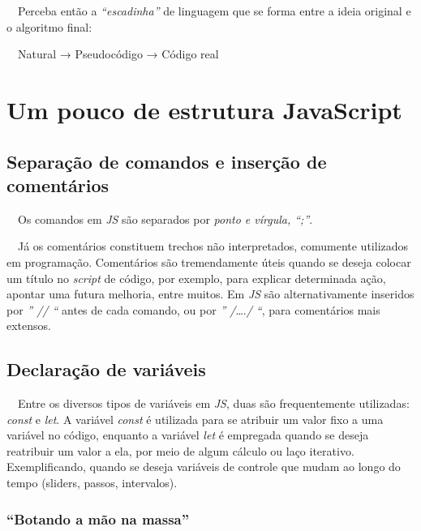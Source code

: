 \documentclass[
  portuguese,
  letterpaper,
  DIV=11,
  numbers=noendperiod]{scrreprt}
\begin{document}
\hfill\break

~~Perceba então a \emph{``escadinha''} de linguagem que se forma entre a
ideia original e o algoritmo final:

~~Natural → Pseudocódigo → Código real


\chapter{Um pouco de estrutura
JavaScript}\label{um-pouco-de-estrutura-javascript}

\section{Separação de comandos e inserção de
comentários}\label{separauxe7uxe3o-de-comandos-e-inseruxe7uxe3o-de-comentuxe1rios}

~~Os comandos em \emph{JS} são separados por \emph{ponto e vírgula,
``;''}.

~~Já os comentários constituem trechos não interpretados, comumente
utilizados em programação. Comentários são tremendamente úteis quando se
deseja colocar um título no \emph{script} de código, por exemplo, para
explicar determinada ação, apontar uma futura melhoria, entre muitos. Em
\emph{JS} são alternativamente inseridos por \emph{'' // ``} antes de
cada comando, ou por \emph{'' /}\ldots.\emph{/ ``}, para comentários
mais extensos.

\section{Declaração de
variáveis}\label{declarauxe7uxe3o-de-variuxe1veis}

~~Entre os diversos tipos de variáveis em \emph{JS}, duas são
frequentemente utilizadas: \emph{const} e \emph{let}. A variável
\emph{const} é utilizada para se atribuir um valor fixo a uma variável
no código, enquanto a variável \emph{let} é empregada quando se deseja
reatribuir um valor a ela, por meio de algum cálculo ou laço iterativo.
Exemplificando, quando se deseja variáveis de controle que mudam ao
longo do tempo (sliders, passos, intervalos).

\subsection{``Botando a mão na massa''}\label{botando-a-muxe3o-na-massa}
\end{document}
